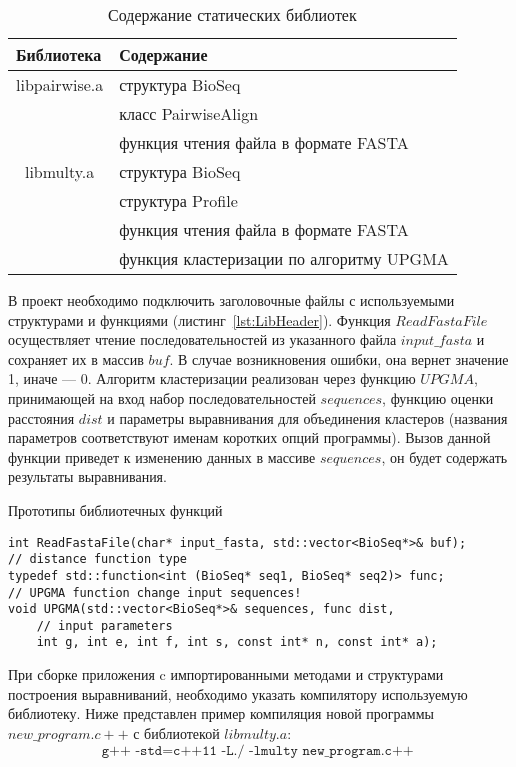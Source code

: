\begin{table}[h]
\caption{Содержание статических библиотек}
\centering
\begin{tabular}{|l|l|}
\hline
Библиотека & Содержание \\ \hline
\multicolumn{ 1}{|c|}{libpairwise.a} & структура BioSeq \\ \cline{ 2- 2}
\multicolumn{ 1}{|l|}{} & класс PairwiseAlign \\ \cline{ 2- 2}
\multicolumn{ 1}{|l|}{} & функция чтения файла в формате FASTA \\ \hline
\multicolumn{ 1}{|c|}{libmulty.a} & структура BioSeq \\ \cline{ 2- 2}
\multicolumn{ 1}{|l|}{} & структура Profile \\ \cline{ 2- 2}
\multicolumn{ 1}{|l|}{} & функция чтения файла в формате FASTA \\ \cline{ 2- 2}
\multicolumn{ 1}{|l|}{} & функция кластеризации по алгоритму UPGMA \\ \hline
\end{tabular}
\label{tabular:staticlibs}
\end{table}

В проект необходимо подключить заголовочные файлы с используемыми структурами и функциями (листинг~\ref{lst:LibHeader}). Функция $ReadFastaFile$ осуществляет чтение последовательностей из указанного файла $input\_fasta$ и сохраняет их в массив $buf$. В случае возникновения ошибки, она вернет значение 1, иначе --- 0. Алгоритм кластеризации реализован через функцию $UPGMA$, принимающей на вход набор последовательностей $sequences$, функцию оценки расстояния $dist$ и параметры выравнивания для объединения кластеров (названия параметров соответствуют именам коротких опций программы). Вызов данной функции приведет к изменению данных в массиве $sequences$, он будет содержать результаты выравнивания.

\begin{algorithm}
	\caption{Прототипы библиотечных функций} \label{lst:LibHeader}
	\begin{lstlisting}
int ReadFastaFile(char* input_fasta, std::vector<BioSeq*>& buf);
// distance function type
typedef std::function<int (BioSeq* seq1, BioSeq* seq2)> func;
// UPGMA function change input sequences!
void UPGMA(std::vector<BioSeq*>& sequences, func dist, 
	// input parameters
	int g, int e, int f, int s, const int* n, const int* a);
	\end{lstlisting}
\end{algorithm}

При сборке приложения c импортированными методами и структурами построения выравниваний, необходимо указать компилятору используемую библиотеку. Ниже представлен пример компиляция новой программы $new\_program.c++$ с библиотекой $libmulty.a$: 
\begin{equation*}
\texttt{g++ -std=c++11 -L./ -lmulty new\_program.c++ }
\end{equation*}